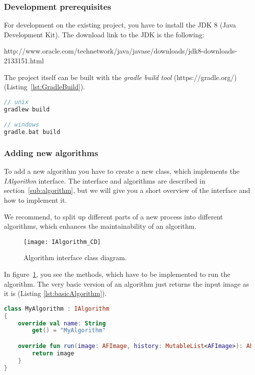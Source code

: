 \subsubsection{Development prerequisites}
For development on the existing project, you have to install the JDK 8 (Java Development Kit). The download link to the JDK is the following:

http://www.oracle.com/technetwork/java/javase/downloads/jdk8-downloads-2133151.html

The project itself can be built with the \textit{gradle build tool} (https://gradle.org/) (Listing~\ref{lst:GradleBuild}).

\begin{lstlisting}[caption={Gradle build tool build of the project.}, label={lst:GradleBuild}, language=Kotlin]
// unix
gradlew build

// windows
gradle.bat build
\end{lstlisting}

\subsubsection{Adding new algorithms}
To add a new algorithm you have to create a new class, which implements the \textit{IAlgorithm} interface. The interface and algorithms are described in section~\ref{sub:algorithm}, but we will give you a short overview of the interface and how to implement it.

We recommend, to split up different parts of a new process into different algorithms, which enhances the maintainability of an algorithm.

\begin{figure}[H]
  \centering
      \texttt{[image: IAlgorithm\_CD]}
  \caption{Algorithm interface class diagram.}
  \label{fig:IAlgorithm_CD_DG}
\end{figure}

In figure~\ref{fig:IAlgorithm_CD_DG}, you see the methods, which have to be implemented to run the algorithm. The very basic version of an algorithm just returns the input image as it is (Listing \ref{lst:basicAlgorithm}).

\begin{lstlisting}[caption={Basic version of an algorithm.}, label={lst:basicAlgorithm}, language=Kotlin]
class MyAlgorithm : IAlgorithm
{
    override val name: String
        get() = "MyAlgorithm"

    override fun run(image: AFImage, history: MutableList<AFImage>): AFImage {
        return image
    }
}
\end{lstlisting}

